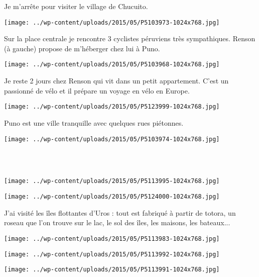 Je m'arrête pour visiter le village de Chucuito. \\
\begin{center} \texttt{[image: ../wp-content/uploads/2015/05/P5103973-1024x768.jpg]} \end{center}

Sur la place centrale je rencontre 3 cyclistes péruviens très sympathiques. Renson (à gauche) propose de m'héberger chez lui à Puno. 
\begin{center} \texttt{[image: ../wp-content/uploads/2015/05/P5103968-1024x768.jpg]} \end{center}
\vspace{-\topsep}
\pagebreak

Je reste 2 jours chez Renson qui vit dans un petit appartement. C'est un passionné de vélo et il prépare un voyage en vélo en Europe. 
\begin{center} \texttt{[image: ../wp-content/uploads/2015/05/P5123999-1024x768.jpg]} \end{center}

Puno est une ville tranquille avec quelques rues piétonnes. \\
\begin{center} \texttt{[image: ../wp-content/uploads/2015/05/P5103974-1024x768.jpg]} \end{center}
\vspace{-\topsep}
\pagebreak
~\\~\\
\begin{center} \texttt{[image: ../wp-content/uploads/2015/05/P5113995-1024x768.jpg]} \end{center}
\begin{center} \texttt{[image: ../wp-content/uploads/2015/05/P5124000-1024x768.jpg]} \end{center}
\vspace{-\topsep}
\vspace{-2.5mm}
\pagebreak

J'ai visité les îles flottantes d'Uros : tout est fabriqué à partir de totora, un roseau que l'on trouve sur le lac, le sol des îles, les maisons, les bateaux...
\begin{center} \texttt{[image: ../wp-content/uploads/2015/05/P5113983-1024x768.jpg]} \end{center}
\begin{center} \texttt{[image: ../wp-content/uploads/2015/05/P5113992-1024x768.jpg]} \end{center}
\begin{center} \texttt{[image: ../wp-content/uploads/2015/05/P5113991-1024x768.jpg]} \end{center}
